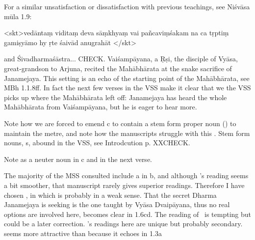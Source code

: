 { For a similar unsatisfaction or dissatisfaction with previous                  teachings, see Niśvāsa mūla 1.9:                 

                 <skt>vedāntaṃ viditaṃ deva sāṃkhyaṃ vai pañcaviṃśakam \danda                      na ca tṛptiṃ gamiṣyāmo hy ṛte śaivād anugrahāt \twodanda</skt>                 

                  and Śivadharmaśāstra... CHECK.  Vaiśampāyana, a Ṛṣi, the disciple of Vyāsa, great-grandson to Arjuna, 		recited the Mahābhārata at the snake sacrifice of                  Janamejaya. This setting is an echo of the starting point of the Mahābhārata, see MBh 1.1.8ff.                 In fact the next few verses in the VSS make it clear that we the VSS                 picks up where the Mahābhārata left off: Janamejaya has heard the whole Mahābhārata from                 Vaiśampāyana, but he is eager to hear more.                 

                 Note how we are forced to emend  c to contain a stem form proper noun ()                 to maintain the metre, and note how the manuscripts struggle with this .                 Stem form nouns, s, abound in the VSS, see Introdcution p. XXCHECK.          }





{ Note  as a neuter noun in  c and in the next verse. }





{ The majority of the MSS consulted include a  in  b,                  and although \msCb's reading seems a bit smoother, that manuscript rarely gives superior readings.                 Therefore I have chosen , in which  is probably in a weak sense.                 That the secret Dharma Janamejaya is seeking is the one taught by Vyāsa Dvaipāyana,                 thus no real options are involved here, becomes clear in 1.6cd.                 The reading of \msM\ is tempting but could be a later correction.  \msM's readings here are unique but probably secondary.  seems more                 attractive than  because it echoes  in 1.3a }





